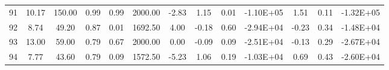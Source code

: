 \begin{landscape}
\begin{center}
\begin{longtable}{|c|c|c|c|c|c|c|c|c|c|c|c|c|}
91 & 10.17 & 150.00 & 0.99 & 0.99 & 2000.00 & -2.83 & 1.15  & 0.01 & -1.10E+05 & 1.51  & 0.11 & -1.32E+05 \\
92 & 8.74  & 49.20  & 0.87 & 0.01 & 1692.50 & 4.00  & -0.18 & 0.60 & -2.94E+04 & -0.23 & 0.34 & -1.48E+04 \\
93 & 13.00 & 59.00  & 0.79 & 0.67 & 2000.00 & 0.00  & -0.09 & 0.09 & -2.51E+04 & -0.13 & 0.29 & -2.67E+04 \\
94 & 7.77  & 43.60  & 0.79 & 0.09 & 1572.50 & -5.23 & 1.06  & 0.19 & -1.03E+04 & 0.69  & 0.43 & -2.60E+04 \\\bottomrule

\end{longtable}
\end{center}
\end{landscape}


